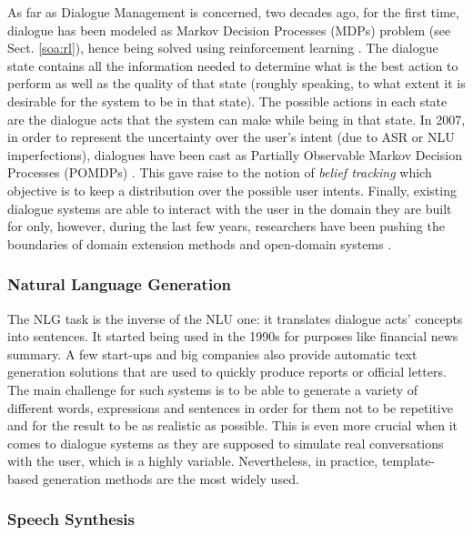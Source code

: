                         As far as Dialogue Management is concerned, two decades ago, for the first time, dialogue has been modeled as Markov Decision Processes (MDPs) problem (see Sect. \ref{soa:rl}), hence being solved using reinforcement learning \cite{Levin1997a}. The dialogue state contains all the information needed to determine what is the best action to perform as well as the quality of that state (roughly speaking, to what extent it is desirable for the system to be in that state). The possible actions in each state are the dialogue acts that the system can make while being in that state. In 2007, in order to represent the uncertainty over the user's intent (due to ASR or NLU imperfections), dialogues have been cast as Partially Observable Markov Decision Processes (POMDPs) \cite{Williams2007}. This gave raise to the notion of \textit{belief tracking} which objective is to keep a distribution over the possible user intents. Finally, existing dialogue systems are able to interact with the user in the domain they are built for only, however, during the last few years, researchers have been pushing the boundaries of domain  extension methods \cite{Gasic2013} and open-domain systems \cite{Pakucs2003,EkeinhorKomi2014,Wang2014}.
                        
                        \subsubsection{Natural Language Generation}
                        
                        The NLG task is the inverse of the NLU one: it translates dialogue acts' concepts into sentences. It started being used in the 1990s for purposes like financial news summary. A few start-ups and big companies also provide automatic text generation solutions that are used to quickly produce reports or official letters. The main challenge for such systems is to be able to generate a variety of different words, expressions and sentences in order for them not to be repetitive and for the result to be as realistic as possible. This is even more crucial when it comes to dialogue systems as they are supposed to simulate real conversations with the user, which is a highly variable. Nevertheless, in practice, template-based generation methods are the most widely used.
                        
                        \subsubsection{Speech Synthesis}

